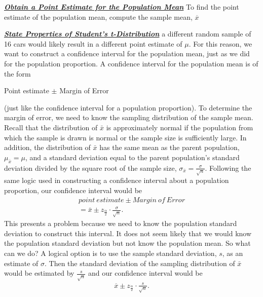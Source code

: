 \documentclass{report}
\begin{document}
     \pagebreak \bigbreak \noindent 
     \textbf{\textit{\underline{Obtain a Point Estimate for the Population Mean}}}
     \bigbreak \noindent 
     To find the point estimate of the population mean, compute the sample mean, $\overline{x} $

     \bigbreak \noindent \bigbreak \noindent 
     \textbf{\textit{\underline{State Properties of Student’s t-Distribution}}}
     \bigbreak \noindent 
     a different random sample of 16 cars would likely result in a different point estimate of $\mu$. For this reason, we want to construct a confidence interval for the population mean, just as we did for the population proportion.
     \bigbreak \noindent 
     A confidence interval for the population mean is of the form
     \begin{center}
         Point estimate $\pm $ Margin of Error
     \end{center}
     \bigbreak \noindent 
     (just like the confidence interval for a population proportion). To determine the margin of error, we need to know the sampling distribution of the sample mean.
     \bigbreak \noindent 
     Recall that the distribution of \(\bar{x}\) is approximately normal if the population from which the sample is drawn is normal or the sample size is sufficiently large. In addition, the distribution of \(\bar{x}\) has the same mean as the parent population, \(\mu_{\bar{x}} = \mu\), and a standard deviation equal to the parent population's standard deviation divided by the square root of the sample size, \(\sigma_{\bar{x}} = \frac{\sigma}{\sqrt{n}}\).
     \bigbreak \noindent 
     Following the same logic used in constructing a confidence interval about a population proportion, our confidence interval would be
     \begin{align*}
         point\ estimate \pm Margin\ of\ Error \\
         =  \bar{x} \pm z_{\frac{\alpha}{2}} \cdot \frac{\sigma}{\sqrt{n}}
     .\end{align*}
     \bigbreak \noindent 
     This presents a problem because we need to know the population standard deviation to construct this interval. It does not seem likely that we would know the population standard deviation but not know the population mean. So what can we do? A logical option is to use the sample standard deviation, \( s \), as an estimate of \( \sigma \). Then the standard deviation of the sampling distribution of \( \bar{x} \) would be estimated by \( \frac{s}{\sqrt{n}} \) and our confidence interval would be
     \begin{align*}
         \overline{x} \pm z_{\frac{\alpha}{2}} \cdot \frac{s}{\sqrt{n}}
     .\end{align*}
\end{document}
